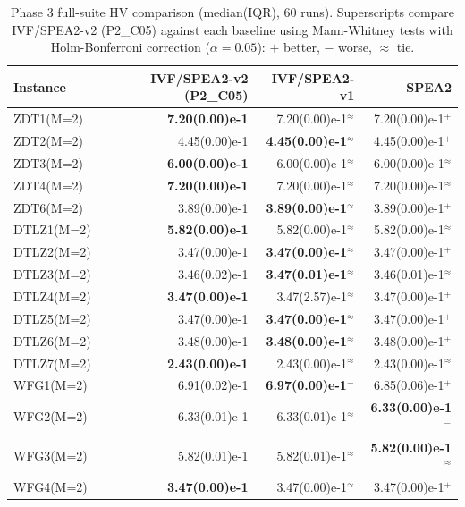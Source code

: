 \begin{table}[t]
\caption{Phase 3 full-suite HV comparison (median(IQR), 60 runs). Superscripts compare IVF/SPEA2-v2 (P2\_C05) against each baseline using Mann-Whitney tests with Holm-Bonferroni correction ($\alpha=0.05$): $+$ better, $-$ worse, $\approx$ tie.}
\label{tab:ablation_v2_phase3_hv}
\centering\tiny
\setlength{\tabcolsep}{3pt}
\begin{tabular}{lrrr}
\toprule
Instance & IVF/SPEA2-v2 (P2\_C05) & IVF/SPEA2-v1 & SPEA2 \\
\midrule
ZDT1(M=2) & \textbf{7.20(0.00)e-1} & 7.20(0.00)e-1$^{\approx}$ & 7.20(0.00)e-1$^{+}$ \\
ZDT2(M=2) & 4.45(0.00)e-1 & \textbf{4.45(0.00)e-1$^{\approx}$} & 4.45(0.00)e-1$^{+}$ \\
ZDT3(M=2) & \textbf{6.00(0.00)e-1} & 6.00(0.00)e-1$^{\approx}$ & 6.00(0.00)e-1$^{\approx}$ \\
ZDT4(M=2) & \textbf{7.20(0.00)e-1} & 7.20(0.00)e-1$^{\approx}$ & 7.20(0.00)e-1$^{\approx}$ \\
ZDT6(M=2) & 3.89(0.00)e-1 & \textbf{3.89(0.00)e-1$^{\approx}$} & 3.89(0.00)e-1$^{+}$ \\
DTLZ1(M=2) & \textbf{5.82(0.00)e-1} & 5.82(0.00)e-1$^{\approx}$ & 5.82(0.00)e-1$^{\approx}$ \\
DTLZ2(M=2) & 3.47(0.00)e-1 & \textbf{3.47(0.00)e-1$^{\approx}$} & 3.47(0.00)e-1$^{+}$ \\
DTLZ3(M=2) & 3.46(0.02)e-1 & \textbf{3.47(0.01)e-1$^{\approx}$} & 3.46(0.01)e-1$^{\approx}$ \\
DTLZ4(M=2) & \textbf{3.47(0.00)e-1} & 3.47(2.57)e-1$^{\approx}$ & 3.47(0.00)e-1$^{+}$ \\
DTLZ5(M=2) & 3.47(0.00)e-1 & \textbf{3.47(0.00)e-1$^{\approx}$} & 3.47(0.00)e-1$^{+}$ \\
DTLZ6(M=2) & 3.48(0.00)e-1 & \textbf{3.48(0.00)e-1$^{\approx}$} & 3.48(0.00)e-1$^{+}$ \\
DTLZ7(M=2) & \textbf{2.43(0.00)e-1} & 2.43(0.00)e-1$^{\approx}$ & 2.43(0.00)e-1$^{\approx}$ \\
WFG1(M=2) & 6.91(0.02)e-1 & \textbf{6.97(0.00)e-1$^{-}$} & 6.85(0.06)e-1$^{+}$ \\
WFG2(M=2) & 6.33(0.01)e-1 & 6.33(0.01)e-1$^{\approx}$ & \textbf{6.33(0.00)e-1$^{-}$} \\
WFG3(M=2) & 5.82(0.01)e-1 & 5.82(0.01)e-1$^{\approx}$ & \textbf{5.82(0.00)e-1$^{\approx}$} \\
WFG4(M=2) & \textbf{3.47(0.00)e-1} & 3.47(0.00)e-1$^{\approx}$ & 3.47(0.00)e-1$^{+}$ \\

\end{tabular}
\end{table}
